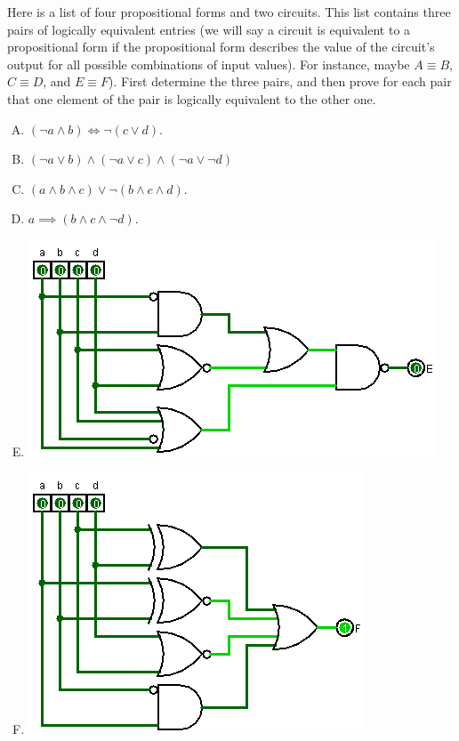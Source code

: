 \item[12]  Here is  a list  of  four propositional  forms  and two  circuits. This  list
  contains three pairs of logically equivalent entries (we will say a circuit is equivalent
  to a propositional form  if the propositional form describes the  value of the circuit's
  output for all possible combinations of input values). For instance, maybe $A \equiv B$,
  $C \equiv D$, and $E  \equiv F$). First determine  the three pairs, and then
  prove for each pair that one element of the pair is logically equivalent to the other
  one.
  \begin{enumerate}[(A)]
  \item $(\lnot a \land b) \iff \lnot(c \lor d)$.
  \item $(\lnot a \lor b)\land(\lnot a \lor c)\land(\lnot a \lor \lnot d)$
  \item $(a \land b \land c)\lor \lnot(b \land c \land d)$.
  \item $a \implies (b \land c \land \lnot d)$. 
  \item \leavevmode{}\hbox{\includegraphics[scale=0.75]{hw1-q2e.png}}
  \item \leavevmode{}\hbox{\includegraphics[scale=0.75]{hw1-q2f.png}}
  \end{enumerate}

